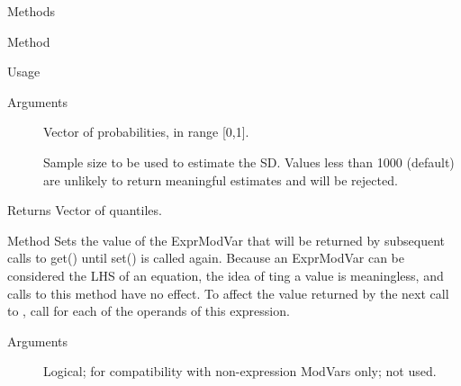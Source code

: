 \documentclass[a4paper]{book}
\begin{document}
\begin{Section}{Methods}
\begin{SubSection}{Method }
\begin{SubSubSection}{Usage}
\end{SubSubSection}


%
\begin{SubSubSection}{Arguments}

\begin{description}

\item[] Vector of probabilities, in range [0,1].

\item[] Sample size to be used to estimate the SD. Values less than
1000 (default) are unlikely to return meaningful estimates and will 
be rejected.

\end{description}


\end{SubSubSection}

%
\begin{SubSubSection}{Returns}
Vector of quantiles.
\end{SubSubSection}

\end{SubSection}



\hypertarget{method-set}{}
%
\begin{SubSection}{Method }
Sets the value of the ExprModVar that will be returned by subsequent
calls to get() until set() is called again. Because an ExprModVar can be 
considered the LHS of an equation, the idea of ting a value
is meaningless, and calls to this method have no effect. To affect the
value returned by the next call to , call  for each
of the operands of this expression.
%


%
\begin{SubSubSection}{Arguments}

\begin{description}

\item[] Logical; for compatibility with non-expression ModVars
only; not used.

\end{description}


\end{SubSubSection}


\end{SubSection}
\end{Section}
\end{document}
